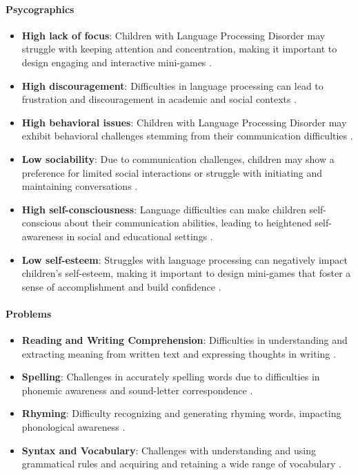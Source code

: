\paragraph{Psycographics}
\begin{itemize}
    \item \textbf{High lack of focus}: Children with Language Processing Disorder may struggle with keeping attention and concentration, making it important to design engaging and interactive mini-games \cite{vanderbilt}.
    \item \textbf{High discouragement}: Difficulties in language processing can lead to frustration and discouragement in academic and social contexts \cite{vanderbilt}.
    \item \textbf{High behavioral issues}: Children with Language Processing Disorder may exhibit behavioral challenges stemming from their communication difficulties \cite{vanderbilt}.
    \item \textbf{Low sociability}: Due to communication challenges, children may show a preference for limited social interactions or struggle with initiating and maintaining conversations \cite{greatspeech}.
    \item \textbf{High self-consciousness}: Language difficulties can make children self-conscious about their communication abilities, leading to heightened self-awareness in social and educational settings \cite{additude}.
    \item \textbf{Low self-esteem}: Struggles with language processing can negatively impact children's self-esteem, making it important to design mini-games that foster a sense of accomplishment and build confidence \cite{vanderbilt}.
\end{itemize}

\paragraph{Problems}
\begin{itemize}
    \item \textbf{Reading and Writing Comprehension}: Difficulties in understanding and extracting meaning from written text and expressing thoughts in writing \cite{vanderbilt}.
    \item \textbf{Spelling}: Challenges in accurately spelling words due to difficulties in phonemic awareness and sound-letter correspondence \cite{gow}.
    \item \textbf{Rhyming}: Difficulty recognizing and generating rhyming words, impacting phonological awareness \cite{additude}.
    \item \textbf{Syntax and Vocabulary}: Challenges with understanding and using grammatical rules and acquiring and retaining a wide range of vocabulary \cite{greatspeech}.
\end{itemize}

